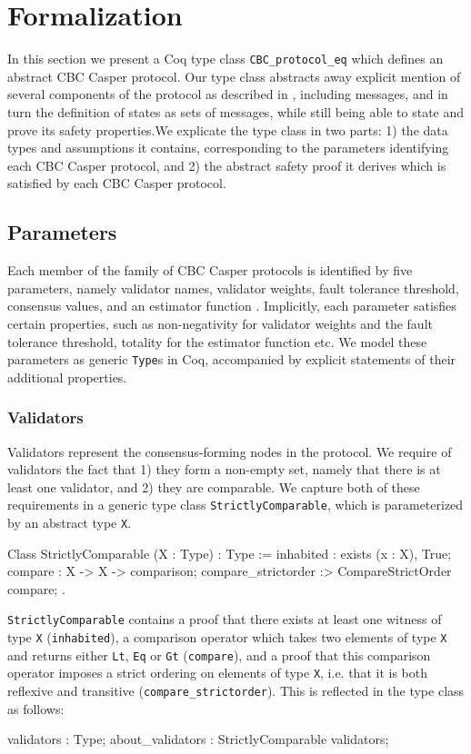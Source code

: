 \documentclass[runningheads]{llncs}
\begin{document}
\section{Formalization}
\label{sec:formalization}
In this section we present a Coq type class \verb|CBC_protocol_eq| which defines an abstract CBC Casper protocol. Our type class abstracts away explicit mention of several components of the protocol as described in \cite{CBCfull}, including messages, and in turn the definition of states as sets of messages, while still being able to state and prove its safety properties.We explicate the type class in two parts: 1) the data types and assumptions it contains, corresponding to the parameters identifying each CBC Casper protocol, and 2) the abstract safety proof it derives which is satisfied by each CBC Casper protocol.

\subsection{Parameters} 
Each member of the family of CBC Casper protocols is identified by five parameters, namely validator names, validator weights, fault tolerance threshold, consensus values, and an estimator function \cite{CBCfull}. Implicitly, each parameter satisfies certain properties, such as non-negativity for validator weights and the fault tolerance threshold, totality for the estimator function etc. We model these parameters as generic \verb|Type|s in Coq, accompanied by explicit statements of their additional properties. 
\subsubsection{Validators} 
Validators represent the consensus-forming nodes in the protocol. We require of validators the fact that 1) they form a non-empty set, namely that there is at least one validator, and 2) they are comparable. We capture both of these requirements in a generic type class \verb|StrictlyComparable|, which is parameterized by an abstract type \verb|X|. 
\begin{coq}
Class StrictlyComparable (X : Type) : Type :=
	{
	inhabited : exists (x : X), True;
	compare : X -> X -> comparison;
	compare_strictorder :> CompareStrictOrder compare;
	}.
\end{coq}
\verb|StrictlyComparable| contains a proof that there exists at least one witness of type \verb|X| (\verb|inhabited|), a comparison operator which takes two elements of type \verb|X| and returns either \verb|Lt|, \verb|Eq| or \verb|Gt| (\verb|compare|), and a proof that this comparison operator imposes a strict ordering on elements of type \verb|X|, i.e. that it is both reflexive and transitive (\verb|compare_strictorder|). 
This is reflected in the type class as follows: 
\begin{coq}
	validators : Type; 
	about_validators : StrictlyComparable validators;
\end{coq}
\end{document}
